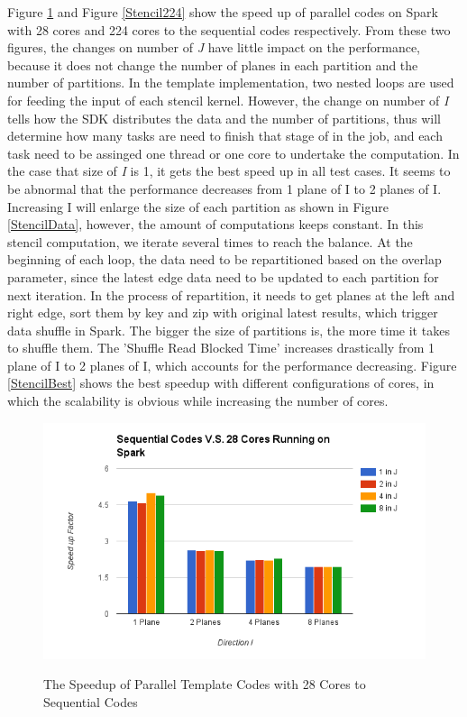 Figure \ref{Stencil28} and Figure \ref{Stencil224} show the speed up of parallel codes on Spark with 28 cores and 224 cores to the sequential codes respectively. 
From these two figures, the changes on number of \emph{J} have little impact on the performance, because it does not change the number of planes in each partition and the number of partitions. In the template implementation, two nested loops are used for feeding the input of each stencil kernel. However, the change on number of \emph{I} tells how the SDK distributes the data and the number of partitions, thus will determine how many tasks are need to finish that stage of in the job, and each task need to be assinged one thread or one core to undertake the computation.
In the case that size of \emph{I} is 1, it gets the best speed up in all test cases. It seems to be abnormal that the performance decreases from 1 plane of I to 2 planes of I. Increasing I will enlarge the size of each partition as shown in Figure \ref{StencilData}, however, the amount of computations keeps constant. In this stencil computation, we iterate several times to reach the balance. 
At the beginning of each loop, the data need to be repartitioned based on the overlap parameter, since the latest edge data need to be updated to each partition for next iteration. In the process of repartition, it needs to get planes at the left and right edge, sort them by key and zip with original latest results, which trigger data shuffle in Spark. The bigger the size of partitions is, the more time it takes to shuffle them. The 'Shuffle Read Blocked Time' increases drastically from 1 plane of I to 2 planes of I, which accounts for the performance decreasing. 
Figure \ref{StencilBest} shows the best speedup with different configurations of cores, in which the scalability is obvious while increasing the number of cores.

\begin{figure}[h]
\centering
\includegraphics[scale=0.7]{figures/Stencil28.png}\\
\caption{The Speedup of Parallel Template Codes with 28 Cores to Sequential Codes}
\label{Stencil28}
\end{figure}

